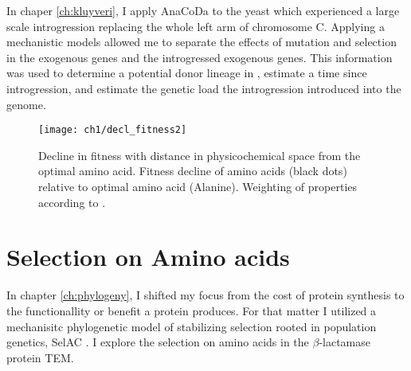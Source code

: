 In chaper \ref{ch:kluyveri}, I apply AnaCoDa to the yeast \kluyveri which experienced a large scale introgression replacing the whole left arm of chromosome C.
Applying a mechanistic models allowed me to separate the effects of mutation and selection in the exogenous \kluyveri genes and the introgressed exogenous genes.
This information was used to determine a potential donor lineage in \gossypii, estimate a time since introgression, and estimate the genetic load the introgression introduced into the  \kluyveri genome.

\begin{figure}[H]
     \centering
	\texttt{[image: ch1/decl\_fitness2]}
	\caption{Decline in fitness with distance in physicochemical space from the optimal amino acid. 
	Fitness decline of amino acids (black dots) relative to optimal amino acid (Alanine). Weighting of properties according to \citet{grantham1974}.}
	\label{fig:decl_fit}
\end{figure}

\section{Selection on Amino acids}

In chapter \ref{ch:phylogeny}, I shifted my focus from the cost of protein synthesis to the functionallity or benefit a protein produces.
For that matter I utilized a mechanisitc phylogenetic model of stabilizing selection rooted in population genetics, SelAC \cite{beaulieu2018}.
I explore the selection on amino acids in the $\beta$-lactamase protein TEM.
 








